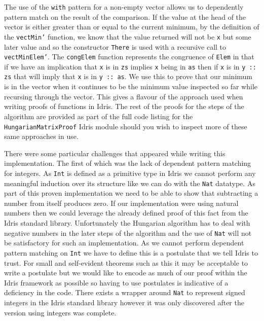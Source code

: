 \documentclass[a4paper, notitlepage]{report}
\begin{document}
The use of the \texttt{with} pattern for a non-empty vector allows us to dependently
pattern match on the result of the comparison. If the value at the head of the
vector is either greater than or equal to the current minimum, by the definition
of the \texttt{vectMin'} function, we know that the value returned will not be \texttt{x} but some
later value and so the constructor \texttt{There} is used with a recursive call to
\texttt{vectMinElem'}. The \texttt{congElem} function represents the congruence of \texttt{Elem} in that if
we have an implication that \texttt{x} is in \texttt{zs} implies \texttt{x} being in \texttt{as} then if \texttt{x} is in \texttt{y
:: zs} that will imply that \texttt{x} is in \texttt{y :: as}. We use this to prove that our
minimum is in the vector when it continues to be the minimum value inspected so
far while recursing through the vector. This gives a flavour of the approach
used when writing proofs of functions in Idris. The rest of the proofs for the
steps of the algorithm are provided as part of the full code listing for the
\texttt{HungarianMatrixProof} Idris module should you wish to inspect more of these same
approaches in use.

There were some particular challenges that appeared while writing this
implementation. The first of which was the lack of dependent pattern matching
for integers. As \texttt{Int} is defined as a primitive type in Idris we cannot perform
any meaningful induction over its structure like we can do with the \texttt{Nat}
datatype. As part of this proven implementation we need to be able to show that
subtracting a number from itself produces zero. If our implementation were using
natural numbers then we could leverage the already defined proof of this fact
from the Idris standard library. Unfortunately the Hungarian algorithm has to
deal with negative numbers in the later steps of the algorithm and the use of
\texttt{Nat} will not be satisfactory for such an implementation. As we cannot perform
dependent pattern matching on \texttt{Int} we have to define this is a postulate that we
tell Idris to trust. For small and self-evident theorems such as this it may be
acceptable to write a postulate but we would like to encode as much of our proof
within the Idris framework as possible so having to use postulates is indicative
of a deficiency in the code. There exists a wrapper around \texttt{Nat} to represent
signed integers in the Idris standard library however it was only discovered
after the version using integers was complete.
\end{document}
